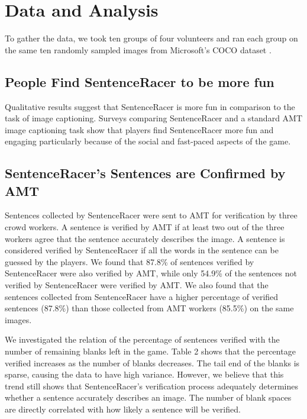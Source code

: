 \documentclass[preprint]{sigchi}
\begin{document}
\section{Data and Analysis}
To gather the data, we took ten groups of four volunteers and ran each group on the same ten randomly sampled images from Microsoft's COCO dataset \cite{coco}.
\subsection{People Find SentenceRacer to be more fun}




Qualitative results suggest that SentenceRacer is more fun in comparison to the task of image captioning. Surveys comparing SentenceRacer and a standard AMT image captioning task show that players find SentenceRacer more fun and engaging particularly because of the social and fast-paced aspects of the game.

\subsection{SentenceRacer's Sentences are Confirmed by AMT}
Sentences collected by SentenceRacer were sent to AMT for verification by three crowd workers. A sentence is verified by AMT if at least two out of the three workers agree that the sentence accurately describes the image. A sentence is considered verified by SentenceRacer if all the words in the sentence can be guessed by the players. We found that 87.8\% of sentences verified by SentenceRacer were also verified by AMT, while only 54.9\% of the sentences not verified by SentenceRacer were verified by AMT. We also found that the sentences collected from SentenceRacer have a higher percentage of verified sentences (87.8\%) than those collected from AMT workers (85.5\%) on the same images.

We investigated the relation of the percentage of sentences verified with the number of remaining blanks left in the game. Table 2 shows that the percentage verified increases as the number of blanks decreases. The tail end of the blanks is sparse, causing the data to have high variance. However, we believe that this trend still shows that SentenceRacer's verification process adequately determines whether a sentence accurately describes an image. The number of blank spaces are directly correlated with how likely a sentence will be verified.
\end{document}
